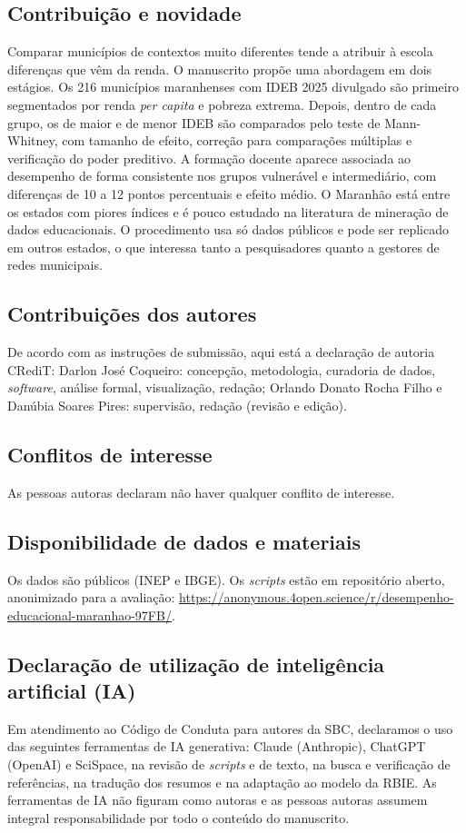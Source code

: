 \documentclass[11pt,a4paper,brazilian]{article}
\begin{document}
\subsection*{Contribuição e novidade}
Comparar municípios de contextos muito diferentes tende a atribuir à escola diferenças que vêm da renda. O manuscrito propõe uma abordagem em dois estágios. Os 216 municípios maranhenses com IDEB 2025 divulgado são primeiro segmentados por renda \textit{per capita} e pobreza extrema. Depois, dentro de cada grupo, os de maior e de menor IDEB são comparados pelo teste de Mann-Whitney, com tamanho de efeito, correção para comparações múltiplas e verificação do poder preditivo. A formação docente aparece associada ao desempenho de forma consistente nos grupos vulnerável e intermediário, com diferenças de 10 a 12 pontos percentuais e efeito médio. O Maranhão está entre os estados com piores índices e é pouco estudado na literatura de mineração de dados educacionais. O procedimento usa só dados públicos e pode ser replicado em outros estados, o que interessa tanto a pesquisadores quanto a gestores de redes municipais.

\subsection*{Contribuições dos autores}
De acordo com as instruções de submissão, aqui está a declaração de autoria CRediT: Darlon José Coqueiro: concepção, metodologia, curadoria de dados, \textit{software}, análise formal, visualização, redação; Orlando Donato Rocha Filho e Danúbia Soares Pires: supervisão, redação (revisão e edição).

\subsection*{Conflitos de interesse}
As pessoas autoras declaram não haver qualquer conflito de interesse.

\subsection*{Disponibilidade de dados e materiais}
Os dados são públicos (INEP e IBGE). Os \textit{scripts} estão em repositório aberto, anonimizado para a avaliação: \url{https://anonymous.4open.science/r/desempenho-educacional-maranhao-97FB/}.

\subsection*{Declaração de utilização de inteligência artificial (IA)}
Em atendimento ao Código de Conduta para autores da SBC, declaramos o uso das seguintes ferramentas de IA generativa: Claude (Anthropic), ChatGPT (OpenAI) e SciSpace, na revisão de \textit{scripts} e de texto, na busca e verificação de referências, na tradução dos resumos e na adaptação ao modelo da RBIE. As ferramentas de IA não figuram como autoras e as pessoas autoras assumem integral responsabilidade por todo o conteúdo do manuscrito.
\end{document}
